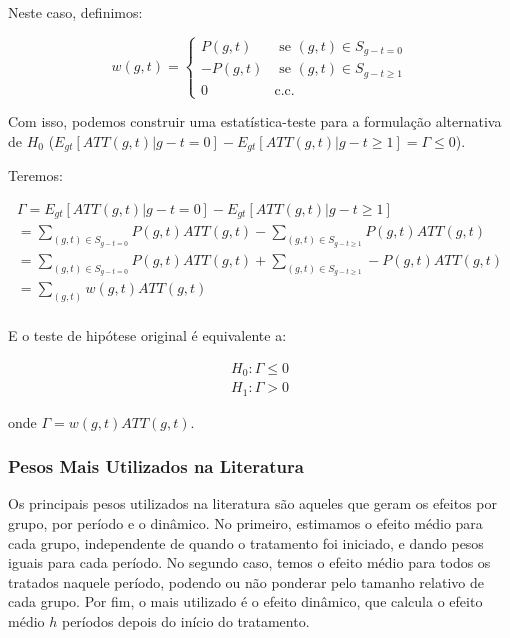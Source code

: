 \documentclass[portugues]{article}
\begin{document}
Neste caso, definimos:

$$ w(g,t) = \begin{cases}
     P(g,t)       & \text{ se }  (g,t) \in  S_{g-t=0}\\
     -P(g,t)  & \text{ se }  (g,t) \in  S_{g-t\geq 1} \\
     0              & \text{c.c.}
\end{cases} $$

Com isso, podemos construir uma estatística-teste para a formulação alternativa de $H_0$ ($ E_{gt}[ATT(g,t)| g - t = 0] - E_{gt}[ATT(g,t)|g-t \geq 1] = \Gamma \leq 0$). 

Teremos: 

\[
\begin{split}
    \Gamma = E_{gt}[ATT(g,t)| g - t = 0] - E_{gt}[ATT(g,t)| g - t \geq 1] \\
    = \sum_{(g,t) \in S_{g-t = 0}} P(g,t) ATT(g,t) - \sum_{(g,t) \in S_{g-t\geq 1}} P(g,t) ATT(g,t) \\
    = \sum_{(g,t) \in S_{g-t = 0}} P(g,t) ATT(g,t) + \sum_{(g,t) \in S_{g-t\geq 1}} -P(g,t) ATT(g,t) \\
      = \sum_{(g,t)} w(g,t) ATT(g,t) \\
\end{split}
\]

E o teste de hipótese original é equivalente a:

\[
\begin{split}
    H_0: \Gamma \leq 0 \\
    H_1: \Gamma > 0
\end{split}
\]

onde $\Gamma = w(g,t) ATT(g,t)$. 



\subsubsection{Pesos Mais Utilizados na Literatura} \label{sec:principaisPesos}

Os principais pesos utilizados na literatura são aqueles que geram os efeitos por grupo, por período e o dinâmico. No primeiro, estimamos o efeito médio para cada grupo, independente de quando o tratamento foi iniciado, e dando pesos iguais para cada período. No segundo caso, temos o efeito médio para todos os tratados naquele período, podendo ou não ponderar pelo tamanho relativo de cada grupo. Por fim, o mais utilizado é o efeito dinâmico, que calcula o efeito médio $h$ períodos depois do início do tratamento.
\end{document}
